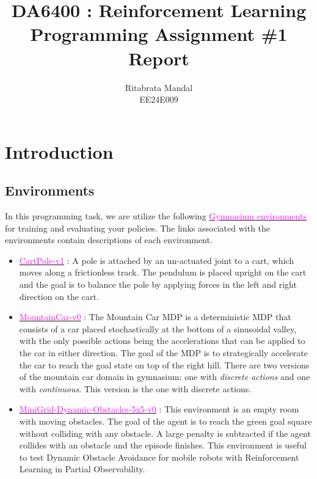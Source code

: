 \documentclass[11pt, a4]{article}
\begin{document}
	\author{Ritabrata Mandal\\ EE24E009}
	\title{DA6400 : Reinforcement Learning\\ Programming Assignment \#1\\ Report}
	\maketitle
	\medskip
	\newpage
	\tableofcontents
	\section{Introduction}
		\subsection{Environments}
		In this programming task, we are utilize the following \href{https://gymnasium.farama.org/}{\textcolor{magenta}{Gymnasium environments}} for training
		and evaluating your policies. The links associated with the environments contain descriptions
		of each environment.
		\begin{itemize}
			\item \href{https://gymnasium.farama.org/environments/classic_control/cart_pole/}{\textcolor{magenta}{CartPole-v1}} : A pole is attached by an un-actuated joint to a cart, which moves along	a frictionless track. The pendulum is placed upright on the cart and the goal is to
			balance the pole by applying forces in the left and right direction on the cart.
			\item \href{https://gymnasium.farama.org/environments/classic_control/mountain_car/}{\textcolor{magenta}{MountainCar-v0}} : The Mountain Car MDP is a deterministic MDP that consists of a
			car placed stochastically at the bottom of a sinusoidal valley, with the only possible
			actions being the accelerations that can be applied to the car in either direction. The
			goal of the MDP is to strategically accelerate the car to reach the goal state on top of
			the right hill. There are two versions of the mountain car domain in gymnasium: one
			with \textit{discrete actions} and one with \textit{continuous}. This version is the one with discrete
			actions.
			\item \href{https://minigrid.farama.org/environments/minigrid/DynamicObstaclesEnv/}{\textcolor{magenta}{MiniGrid-Dynamic-Obstacles-5x5-v0}} : This environment is an empty
			room with moving obstacles. The goal of the agent is to reach the green goal square
			without colliding with any obstacle. A large penalty is subtracted if the agent collides
			with an obstacle and the episode finishes. This environment is useful to test Dynamic
			Obstacle Avoidance for mobile robots with Reinforcement Learning in Partial Observability.
		\end{itemize}
\end{document}
